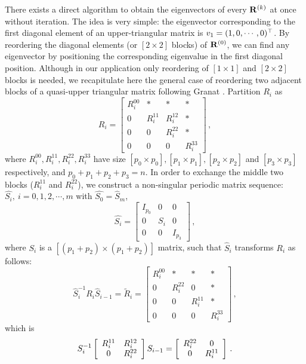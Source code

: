 \documentclass[final,leqno,onefignum,onetabnum]{siamltexmm}
\begin{document}
There exists a direct algorithm to obtain the eigenvectors of every
$\mathbf{R}^{(k)}$ at once without iteration. The idea is very simple: the
eigenvector corresponding to the first diagonal element of an
upper-triangular matrix is $v_{1}=(1,0,\cdots,0)^\top $. By
reordering the diagonal elements (or $[2\!\times\! 2]$ blocks) of
$\mathbf{R}^{(0)}$, we can find any eigenvector by positioning the corresponding
eigenvalue in the first diagonal position. Although in our application
only reordering of $[1\!\times\! 1]$ and $[2\!\times\! 2]$ blocks is
needed, we recapitulate here the general case of reordering two adjacent
blocks of a quasi-upper triangular matrix following
Granat \edit{\etal}.
Partition $R_{i}$ as
\[
R_{i}=
\left[
\begin{array}{c|cc|c}
  R^{00}_{i} & * & *& * \\ \hline
  0 & R^{11}_{i} & R^{12}_{i} & * \\
  0 & 0 & R^{22}_{i} & * \\ \hline
  0 & 0 & 0 & R^{33}_{i}
\end{array}
\right]
\,,
\]
where $R^{00}_{i}, R^{11}_{i},R^{22}_{i},R^{33}_{i}$ have size
$[p_{0}\!\times\! p_{0}], [p_{1}\!\times\! p_{1}], [p_{2}\!\times\!
p_{2}]$ and $[p_{3}\!\times\! p_{3}]$ respectively, and
$p_{0}+p_{1}+p_{2}+p_{3}=n$. In order to exchange the middle two blocks
($R^{11}_{i}$ and $R^{22}_{i}$), we construct a non-singular periodic
matrix sequence: $\hat{S_{i}},\:i=0,1,2,\cdots,m$ with
$\hat{S_{0}}=\hat{S}_{m}$,
\[
\hat{S_{i}}=
\left[
\begin{array}{c|c|c}
  I_{p_{0}} & 0 & 0  \\ \hline
  0 & S_{i} & 0 \\ \hline
  0 & 0 & I_{p_{3}}
\end{array}
\right]
\,,
\]
where $S_{i}$ is a $[(p_{1}+p_{2})\!\times\! (p_{1}+p_{2})]$ matrix,
such that $\hat{S}_{i}$ transforms $R_{i}$ as follows:
\begin{equation}
\label{eq:xdtransform}
\hat{S}_{i}^{-1}R_{i}\hat{S}_{i-1}=\tilde{R}_{i}=
\left[
\begin{array}{c|cc|c}
  R^{00}_{i} & * & *& * \\ \hline
  0 & R^{22}_{i} & 0 & * \\
  0 & 0 & R^{11}_{i} & * \\ \hline
  0 & 0 & 0 & R^{33}_{i}
\end{array}
\right]
\,,
\end{equation}
which is
\[
S^{-1}_{i}
\left[
\begin{array}{c c}
  R^{11}_{i} & R^{12}_{i} \\
  0 & R^{22}_{i}
\end{array}
\right]
S_{i-1}=
\left[
\begin{array}{c c}
  R^{22}_{i} & 0 \\
  0 & R^{11}_{i}
\end{array}
\right]
\,.
\]
\end{document}
